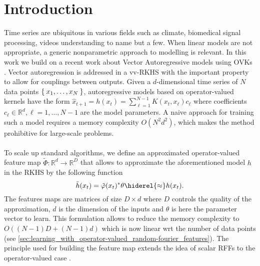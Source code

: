 

\section{Introduction}
Time series are ubiquitous in various fields such as climate, biomedical signal
processing, videos understanding to name but a few. When linear models are not
appropriate, a generic nonparametric approach to modelling is relevant. In this
work we build on a recent work about Vector Autoregressive models using
\aclp{OVK} \cite{Lim2013,Lim2015}. Vector autoregression is
addressed in a \acl{vv-RKHS} with the important property to allow for couplings
between outputs. Given a $d$-dimensional time series of $N$ data points
$\Set{x_1,\dots, x_N}$, autoregressive models based on operator-valued kernels
have the form $\hat{x}_{t+1}=h(x_t)=\sum_{\ell=1}^{N-1}K(x_t,x_\ell){c}_\ell$
where coefficients ${c}_\ell\in\mathbb{R}^d, \ell=1,\dots,N-1$ are the model
parameters. A naive approach for training such a model requires a memory
complexity $O(N^2d^2)$, which makes the method prohibitive for large-scale
problems.
\paragraph{}
To scale up standard algorithms, we define an approximated operator-valued
feature map $\tilde{\Phi}:\mathbb{R}^d\to\mathbb{R}^D$ that allows to
approximate the aforementioned model $h$ in the \ac{RKHS} by the following
function 
\begin{dmath*}
    \tilde{h}(x_t) = \tilde{\Phi}(x_t)^*\theta \hiderel{\approx} h(x_t).
\end{dmath*}
The features maps are matrices of size $D\times  d$ where $D$ controls the
quality of the approximation, $d$ is the dimension of the inputs and $\theta$
is here the parameter vector to learn. This formulation allows to reduce the
memory complexity to $O((N-1)D + (N-1)d)$ which is now linear \acs{wrt} the
number of data points
(see \cref{sec:learning_with_operator-valued_random-fourier_features}). The
principle used for building the feature map extends the idea of scalar
\aclp{RFF} to the operator-valued case \citep{Rahimi2007,sutherland2015}.

